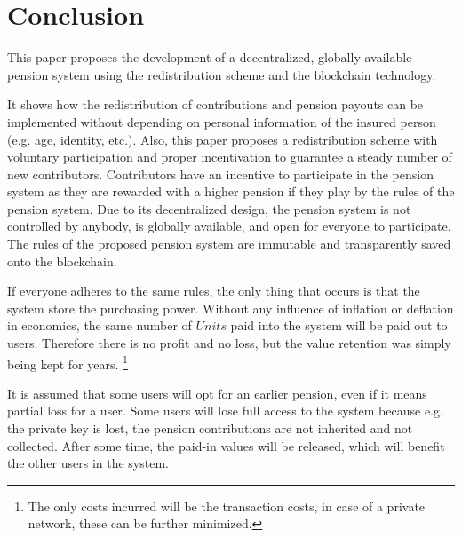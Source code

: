 \section{Conclusion}

This paper proposes the development of a decentralized, globally available pension system using the redistribution scheme and the blockchain technology.

It shows how the redistribution of contributions and pension payouts can be implemented without depending on personal information of the insured person (e.g. age, identity, etc.). 
Also, this paper proposes a redistribution scheme with voluntary participation and proper incentivation to guarantee a steady number of new contributors. Contributors have an incentive to participate in the pension system as they are rewarded with a higher pension if they play by the rules of the pension system. 
Due to its decentralized design, the pension system is not controlled by anybody, is globally available, and open for everyone to participate. The rules of the proposed pension system are immutable and transparently saved onto the blockchain. 

If everyone adheres to the same rules, the only thing that occurs is that the system store the purchasing power. Without any influence of inflation or deflation in economics, the same number of $Units$ paid into the system will be paid out to users. Therefore there is no profit and no loss, but the value retention was simply being kept for years. \footnote{ The only costs incurred will be the transaction costs, in case of a private network, these can be further minimized.}

It is assumed that some users will opt for an earlier pension, even if it means partial loss for a user. Some users will lose full access to the system because e.g. the private key is lost, the pension contributions are not inherited and not collected. After some time, the paid-in values will be released, which will benefit the other users in the system.


